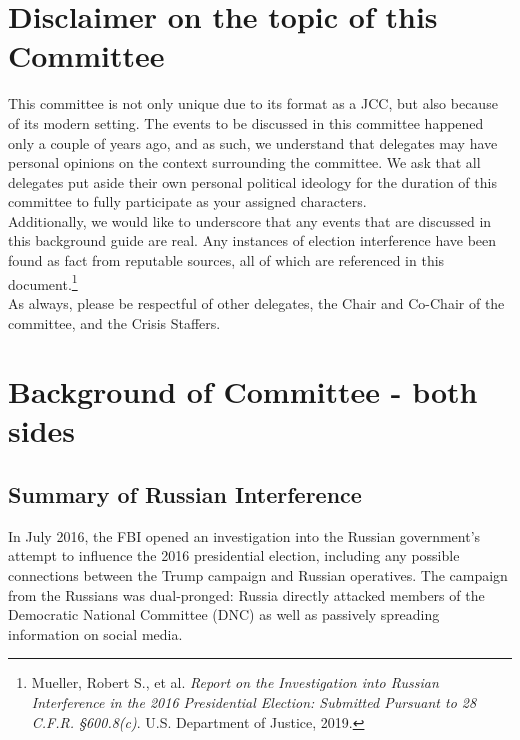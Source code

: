 \documentclass[10pt, letterpaper]{article}
\begin{document}
\section{Disclaimer on the topic of this Committee}

This committee is not only unique due to its format as a JCC, but also
because of its modern setting. The events to be discussed in this
committee happened only a couple of years ago, and as such, we
understand that delegates may have personal opinions on the context
surrounding the committee. We ask that all delegates put aside their own
personal political ideology for the duration of this committee to fully
participate as your assigned characters. \\

Additionally, we would like to underscore that any events that are
discussed in this background guide are real. Any instances of election
interference have been found as fact from reputable sources, all of
which are referenced in this document.\footnote{Mueller, Robert S., et
  al. \emph{Report on the Investigation into Russian Interference in the
  2016 Presidential Election: Submitted Pursuant to 28 C.F.R.
  §600.8(c)}. U.S. Department of Justice, 2019.} \\

As always, please be respectful of other delegates, the Chair and
Co-Chair of the committee, and the Crisis Staffers.

\newpage
\section{Background of Committee - both sides}

\subsection{Summary of Russian Interference}

In July 2016, the FBI opened an investigation into the Russian
government's attempt to influence the 2016 presidential election,
including any possible connections between the Trump campaign and
Russian operatives. The campaign from the Russians was dual-pronged:
Russia directly attacked members of the Democratic National Committee
(DNC) as well as passively spreading information on social media. \\
\end{document}
